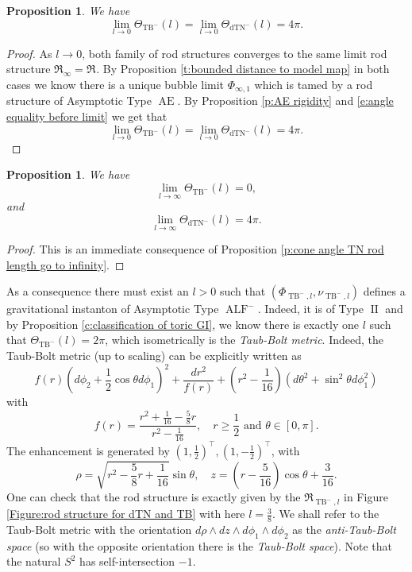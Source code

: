\documentclass[a4paper,11pt]{amsart}
\newtheorem{proposition}[theorem]{Proposition}
\theoremstyle{definition}
\numberwithin{equation}{section}
\newcommand{\mR} {\mathfrak R}
\DeclareMathOperator{\II}{II}
\DeclareMathOperator{\Ae}{AE}
\DeclareMathOperator{\ALF}{ALF}
\DeclareMathOperator{\dTN}{dTN}
\DeclareMathOperator{\TB}{TB}
\DeclareMathOperator{\TNm}{TN^{--}}
\begin{document}
\begin{proposition}
	We have $$\lim_{l\rightarrow 0}\Theta_{\TB^-}(l)=\lim_{l\rightarrow 0}\Theta_{\dTN^{-}}(l)=4\pi.$$
\end{proposition}
\begin{proof}
	As $l\rightarrow 0$, both family of rod structures converges to the same limit rod structure $\mR_\infty=\mR^{\TNm}$.  By Proposition \ref{t:bounded distance to model map} in both cases we know there is a unique  bubble limit $\Phi_{\infty, 1}$ which is tamed by a rod structure of  Asymptotic Type  $\Ae$. By Proposition \ref{p:AE rigidity} and \eqref{e:angle equality before limit} we get that 
    $$\lim_{l\rightarrow 0}\Theta_{\TB^-}(l)=\lim_{l\rightarrow 0}\Theta_{\dTN^{-}}(l)=4\pi.$$
\end{proof}

\begin{proposition}
  We have $$\lim_{l\rightarrow \infty}\Theta_{\TB^-}(l)=0,$$
  and $$\lim_{l\rightarrow \infty}\Theta_{\dTN^{-}}(l)= 4\pi.$$
\end{proposition}
\begin{proof}
  This is an immediate consequence of Proposition \ref{p:cone angle TN rod length go to infinity}.
\end{proof}

As a consequence there must exist an $l>0$ such that $(\Phi_{\TB^-, l}, \nu_{\TB^-, l})$ defines a gravitational instanton of Asymptotic Type $\ALF^-$. Indeed, it is of Type $\II$ and by Proposition \ref{c:classification of toric GI}, we know there is exactly one $l$ such that $\Theta_{\TB^-}(l)=2\pi$, which isometrically is the \emph{Taub-Bolt metric}. Indeed, the Taub-Bolt metric (up to scaling) can be explicitly written as 
\begin{equation}\label{eq:explicit Taub-bolt}
    f(r)(d\phi_2+\frac{1}{2}\cos\theta d\phi_1)^2+\frac{dr^2}{f(r)}+(r^2-\frac{1}{16})(d\theta^2+\sin^2\theta d\phi_1^2)
\end{equation}
with 
$$f(r)=\frac{r^2+\frac{1}{16}-\frac{5}{8}r}{r^2-\frac{1}{16}},\quad r\geq \frac{1}{2}\text{ and }\theta\in[0,\pi].$$
The enhancement is generated by $(1,\frac{1}{2})^\top,(1,-\frac{1}{2})^\top$, with
$$\rho=\sqrt{r^2-\frac{5}{8}r+\frac{1}{16}}\sin\theta,\quad z=(r-\frac{5}{16})\cos\theta+\frac{3}{16}.$$
One can check that the rod structure is exactly given by the $\mR_{\TB^-,l}$ in Figure \ref{Figure:rod structure for dTN and TB} with here $l=\frac{3}{8}$. 
We shall refer to the Taub-Bolt metric with the orientation $d\rho\wedge dz \wedge d\phi_1\wedge d\phi_2$ as the \emph{anti-Taub-Bolt space} (so with the opposite orientation there is the \emph{Taub-Bolt space}). Note that the natural $S^2$  has self-intersection $-1$. 
\end{document}
